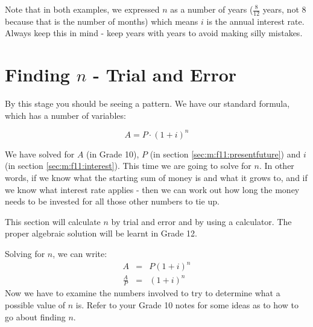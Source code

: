 Note that in both examples, we expressed $n$ as a number of years ($\frac{8}{12}$ years, not 8 because that is the number of months) which means $i$ is the annual interest rate. Always keep this in mind - keep years with years to avoid making silly mistakes.


\section{Finding $n$ - Trial and Error}
\label{sec:m:f11:term}
By this stage you should be seeing a pattern. We have our standard formula, which has a number of variables:

\begin{equation*}
A = P \cdot (1+i)^n
\end{equation*}

We have solved for $A$ (in Grade 10), $P$ (in section \ref{sec:m:f11:presentfuture}) and $i$ (in section \ref{sec:m:f11:interest}). This time we are going to solve for $n$. In other words, if we know what the starting sum of money is and what it grows to, and if we know what interest rate applies - then we can work out how long the money needs to be invested for all those other numbers to tie up.

This section will calculate $n$ by trial and error and by using a calculator. The proper algebraic solution will be learnt in Grade 12.

Solving for $n$, we can write:
\begin{eqnarray*}
A &=& P(1+i)^n\\
\frac{A}{P}&=&(1+i)^n
\end{eqnarray*}
Now we have to examine the numbers involved to try to determine what a possible value of $n$ is. Refer to your Grade 10 notes for some ideas as to how to go about finding $n$.


